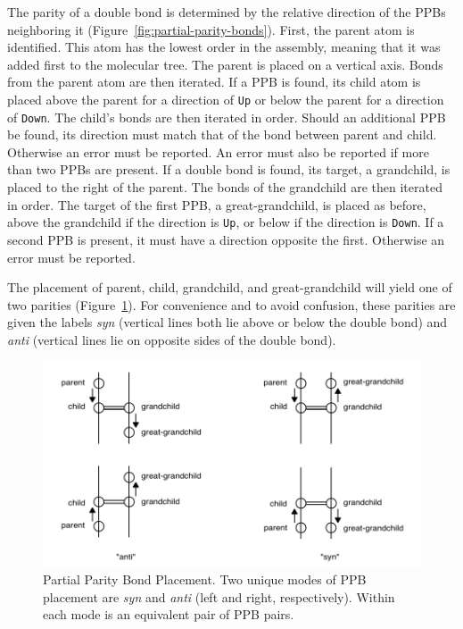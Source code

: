 \documentclass{article}
\def\ttt{\texttt}
\begin{document}
The parity of a double bond is determined by the relative direction of the PPBs neighboring it (Figure~\ref{fig:partial-parity-bonds}). First, the parent atom is identified. This atom has the lowest order in the assembly, meaning that it was added first to the molecular tree. The parent is placed on a vertical axis. Bonds from the parent atom are then iterated. If a PPB is found, its child atom is placed above the parent for a direction of \ttt{Up} or below the parent for a direction of \ttt{Down}. The child's bonds are then iterated in order. Should an additional PPB be found, its direction must match that of the bond between parent and child. Otherwise an error must be reported. An error must also be reported if more than two PPBs are present. If a double bond is found, its target, a grandchild, is placed to the right of the parent. The bonds of the grandchild are then iterated in order. The target of the first PPB, a great-grandchild, is placed as before, above the grandchild if the direction is \ttt{Up}, or below if the direction is \ttt{Down}. If a second PPB is present, it must have a direction opposite the first. Otherwise an error must be reported.

The placement of parent, child, grandchild, and great-grandchild will yield one of two parities (Figure~\ref{fig:ppb-placement}). For convenience and to avoid confusion, these parities are given the labels  \textit{syn} (vertical lines both lie above or below the double bond) and \textit{anti} (vertical lines lie on opposite sides of the double bond).

\begin{figure}
    \centering
    \includegraphics[width=\columnwidth]{partial-parity-bond-placement.pdf}
    \caption{Partial Parity Bond Placement. Two unique modes of PPB placement are \textit{syn} and \textit{anti} (left and right, respectively). Within each mode is an equivalent pair of PPB pairs.}
    \label{fig:ppb-placement}
\end{figure}
\end{document}
